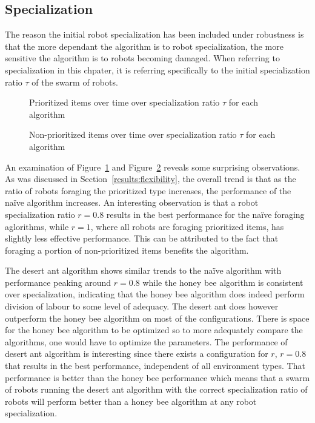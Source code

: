 \subsection{Specialization}
\label{results:specialization}

The reason the initial robot specialization has been included under robustness is that the more dependant the algorithm is to robot specialization, the more sensitive  the algorithm is to robots becoming damaged. When referring to specialization in this chpater, it is referring specifically to the initial specialization ratio $\tau$ of the swarm of robots. 

\begin{figure}[!htb]
\centering
\resizebox{\textwidth}{!}{}
\caption{Prioritized items over time over specialization ratio $\tau$ for each algorithm }
\label{divisiongoldplot}
\end{figure}

\begin{figure}[!htb]
\centering
\resizebox{\textwidth}{!}{}
\caption{Non-prioritized items over time over specialization ratio $\tau$ for each algorithm}
\label{divisionwasteplot}
\end{figure}

An examination of Figure~\ref{divisiongoldplot} and Figure~\ref{divisionwasteplot} reveals some surprising observations.
As was discussed in Section~\ref{results:flexibility}, the overall trend is that as the ratio of robots foraging the prioritized type increases, the performance of the na\"ive algorithm increases. An interesting observation is that a robot specialization ratio $r=0.8$ results in the best performance for the na\"ive foraging aglorithms, while $r=1$, where all robots are foraging prioritized items, has slightly less effective performance. This can be attributed to the fact that foraging a portion of non-prioritized items benefits the algorithm.

The desert ant algorithm shows similar trends to the na\"ive algorithm with performance peaking around $r=0.8$ while the honey bee algorithm is consistent over specialization, indicating that the honey bee algorithm does indeed perform division of labour to some level of adequacy. The desert ant does however outperform the honey bee algorithm on most of the configurations. There is space for the honey bee algorithm to be optimized so to more adequately compare the algorithms, one would have to optimize the parameters. 
The performance of desert ant algorithm is interesting since there exists a configuration for $r$, $r=0.8$ that results in the best performance, independent of all environment types. That performance is better than the honey bee performance which means that a swarm of robots running the desert ant algorithm with the correct specialization ratio of robots will perform better than a honey bee algorithm at any robot specialization. 

